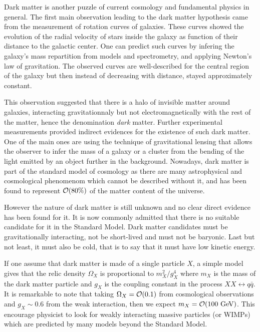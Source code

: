     Dark matter is another puzzle of current cosmology and fundamental physics in general.
    The first main observation leading to the dark matter hypothesis came from the measurement
    of rotation curves of galaxies. These curves showed the evolution of the radial velocity
    of stars inside the galaxy as function of their distance to the galactic center. One
    can predict such curves by infering the galaxy's mass repartition from models and
    spectrometry, and applying Newton's law of gravitation. The observed curves are
    well-described for the central region of the galaxy but then instead of decreasing
    with distance, stayed approximately constant.

    This observation suggested that there is a halo of invisible matter around
    galaxies, interacting gravitationnaly but not electromagnetically with the rest of the
    matter, hence the denomination \emph{dark} matter. Further experimental measurements
    provided indirect evidences for the existence of such dark matter. One of the main
    ones are using the technique of gravitational lensing that allows the observer to
    infer the mass of a galaxy or a cluster from the bending of the light emitted by
    an object further in the background. Nowadays, dark matter is part of the standard
    model of cosmology as there are many astrophysical and cosmological phenomenom which
    cannot be described without it, and has been found to represent $\mathcal{O}(80\%)$ of
    the matter content of the universe.

    However the nature of dark matter is still unknown and no clear direct evidence has
    been found for it. It is now commonly admitted that there is no suitable candidate
    for it in the Standard Model. Dark matter candidates must be gravitationally interacting,
    not be short-lived and must not be baryonic. Last but not least, it must also be
    cold, that is to say that it must have low kinetic energy.

    If one assume that dark matter is made of a single particle $X$, a simple model gives that
    the relic density $\Omega_X$ is proportional to $m_X^2 / g^4_X$ where $m_X$ is the
    mass of the dark matter particle and $g_X$ is the coupling constant in the process
    $XX \leftrightarrow q\bar{q}$. It is remarkable to note that taking $\Omega_X = \mathcal{O}(0.1)$
    from cosmological observations and $g_X \sim 0.6$ from the weak interaction, then
    we expect $m_X = \mathcal{O}(100~\text{GeV})$. This encourage physicist to look for weakly
    interacting massive particles (or WIMPs) which are predicted by many models beyond
    the Standard Model.

